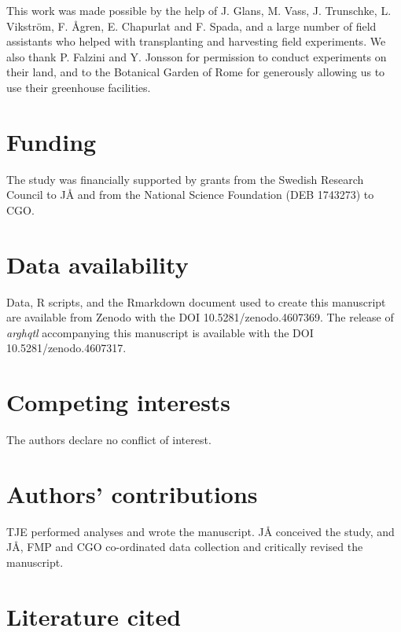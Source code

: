 \documentclass[]{article}
\begin{document}
This work was made possible by the help of J. Glans, M. Vass, J. Trunschke, L. Vikström, F. Ågren, E. Chapurlat and F. Spada, and a large number of field assistants who helped with transplanting and harvesting field experiments. We also thank P. Falzini and Y. Jonsson for permission to conduct experiments on their land, and to the Botanical Garden of Rome for generously allowing us to use their greenhouse facilities.

\hypertarget{funding}{%
\section{Funding}\label{funding}}

The study was financially supported by grants from the Swedish Research Council to JÅ and from the National Science Foundation (DEB 1743273) to CGO.

\hypertarget{data-availability}{%
\section{Data availability}\label{data-availability}}

Data, R scripts, and the Rmarkdown document used to create this manuscript are available from Zenodo with the DOI 10.5281/zenodo.4607369. The release of \emph{arghqtl} accompanying this manuscript is available with the DOI 10.5281/zenodo.4607317.

\hypertarget{competing-interests}{%
\section{Competing interests}\label{competing-interests}}

The authors declare no conflict of interest.

\hypertarget{authors-contributions}{%
\section{Authors' contributions}\label{authors-contributions}}

TJE performed analyses and wrote the manuscript. JÅ conceived the study, and JÅ, FMP and CGO co-ordinated data collection and critically revised the manuscript.

\hypertarget{literature-cited}{%
\section{Literature cited}\label{literature-cited}}
\end{document}
